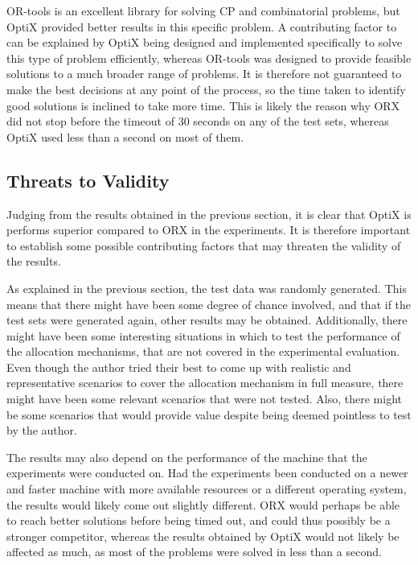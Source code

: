 OR-tools is an excellent library for solving CP and combinatorial problems, but OptiX provided better results in this specific problem. A contributing factor to can be explained by OptiX being designed and implemented specifically to solve this type of problem efficiently, whereas OR-tools was designed to provide feasible solutions to a much broader range of problems. It is therefore not guaranteed to make the best decisions at any point of the process, so the time taken to identify good solutions is inclined to take more time. This is likely the reason why ORX did not stop before the timeout of 30 seconds on any of the test sets, whereas OptiX used less than a second on most of them.

\subsection{Threats to Validity}

Judging from the results obtained in the previous section, it is clear that OptiX is performs superior compared to ORX in the experiments. It is therefore important to establish some possible contributing factors that may threaten the validity of the results.

As explained in the previous section, the test data was randomly generated. This means that there might have been some degree of chance involved, and that if the test sets were generated again, other results may be obtained. Additionally, there might have been some interesting situations in which to test the performance of the allocation mechanisms, that are not covered in the experimental evaluation. Even though the author tried their best to come up with realistic and representative scenarios to cover the allocation mechanism in full measure, there might have been some relevant scenarios that were not tested. Also, there might be some scenarios that would provide value despite being deemed pointless to test by the author.

The results may also depend on the performance of the machine that the experiments were conducted on. Had the experiments been conducted on a newer and faster machine with more available resources or a different operating system, the results would likely come out slightly different. ORX would perhaps be able to reach better solutions before being timed out, and could thus possibly be a stronger competitor, whereas the results obtained by OptiX would not likely be affected as much, as most of the problems were solved in less than a second.

